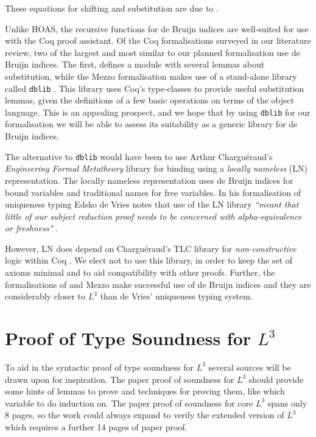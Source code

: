 \documentclass[]{unswthesis}
\newcommand{\SSPHS}{\text{SSPHS }}
\let\c\texttt
\let\i\textit
\begin{document}
These equations for shifting and substitution are due to \cite{tapl}.

Unlike HOAS, the recursive functions for de Bruijn indices are well-suited for use with the Coq proof assistant. Of the Coq formalisations surveyed in our literature review, two of the largest and most similar to our planned formalisation use de Bruijn indices. The first, \SSPHS \cite{pottier13} defines a module with several lemmas about substitution, while the Mezzo formalisation \cite{mezzo14} makes use of a stand-alone library called \c{dblib} \cite{dblib13}. This library uses Coq's type-classes to provide useful substitution lemmas, given the definitions of a few basic operations on terms of the object language. This is an appealing prospect, and we hope that by using \c{dblib} for our formalisation we will be able to assess its suitability as a generic library for de Bruijn indices.

The alternative to \c{dblib} would have been to use Arthur Chargu\'{e}raud's \i{Engineering Formal Metatheory} library \cite{aydemir08} for binding using a \i{locally nameless} (LN) representation. The locally nameless representation uses de Bruijn indices for bound variables and traditional names for free variables. In his formalisation of uniqueness typing Edsko de Vries notes that use of the LN library \i{``meant that little of our subject reduction proof needs to be concerned with alpha-equivalence or freshness"} \cite{deVries07}.

However, LN does depend on Chargu\'{e}raud's TLC library for \i{non-constructive} logic within Coq \cite{tlc15}. We elect not to use this library, in order to keep the set of axioms minimal and to aid compatibility with other proofs. Further, the formalisations of \SSPHS and Mezzo make successful use of de Bruijn indices and they are considerably closer to $L^3$ than de Vries' uniqueness typing system.

\section{Proof of Type Soundness for $L^3$}
\label{sec:proof_proposal}

To aid in the syntactic proof of type soundness for $L^3$ several sources will be drawn upon for inspiration. The paper proof of soundness for $L^3$ should provide some hints of lemmas to prove and techniques for proving them, like which variable to do induction on. The paper proof of soundness for core $L^3$ spans only 8 pages, so the work could always expand to verify the extended version of $L^3$ which requires a further 14 pages of paper proof.
\end{document}
